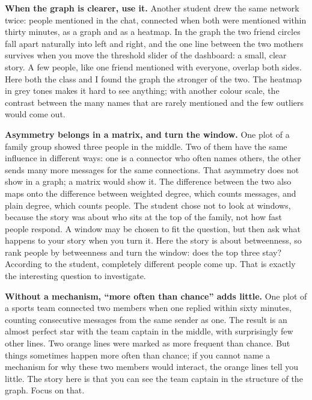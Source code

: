 \documentclass[12pt, a4paper]{article}
\theoremstyle{definition}
\theoremstyle{remark}
\begin{document}
\textbf{When the graph is clearer, use it.} Another student drew the same network twice: people mentioned in the chat, connected when both were mentioned within thirty minutes, as a graph and as a heatmap. In the graph the two friend circles fall apart naturally into left and right, and the one line between the two mothers survives when you move the threshold slider of the dashboard: a small, clear story. A few people, like one friend mentioned with everyone, overlap both sides. Here both the class and I found the graph the stronger of the two. The heatmap in grey tones makes it hard to see anything; with another colour scale, the contrast between the many names that are rarely mentioned and the few outliers would come out.

\textbf{Asymmetry belongs in a matrix, and turn the window.} One plot of a family group showed three people in the middle. Two of them have the same influence in different ways: one is a connector who often names others, the other sends many more messages for the same connections. That asymmetry does not show in a graph; a matrix would show it. The difference between the two also maps onto the difference between weighted degree, which counts messages, and plain degree, which counts people. The student chose not to look at windows, because the story was about who sits at the top of the family, not how fast people respond. A window may be chosen to fit the question, but then ask what happens to your story when you turn it. Here the story is about betweenness, so rank people by betweenness and turn the window: does the top three stay? According to the student, completely different people come up. That is exactly the interesting question to investigate.

\textbf{Without a mechanism, ``more often than chance'' adds little.} One plot of a sports team connected two members when one replied within sixty minutes, counting consecutive messages from the same sender as one. The result is an almost perfect star with the team captain in the middle, with surprisingly few other lines. Two orange lines were marked as more frequent than chance. But things sometimes happen more often than chance; if you cannot name a mechanism for why these two members would interact, the orange lines tell you little. The story here is that you can see the team captain in the structure of the graph. Focus on that.
\end{document}

